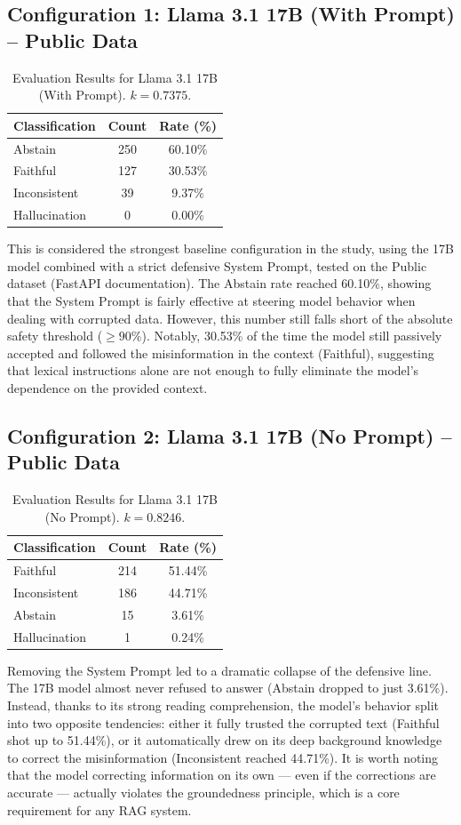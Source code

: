 \documentclass[
    a4paper,
    man,
    floatsintext
]{glossaPX2}
\begin{document}
\subsection{Configuration 1: Llama 3.1 17B (With Prompt) -- Public Data}
\begin{table}[H]
\centering
\caption{Evaluation Results for Llama 3.1 17B (With Prompt). $k = 0.7375$.}
\label{tab:17b_prompt}
\begin{tabular}{lcc}
\toprule
\textbf{Classification} & \textbf{Count} & \textbf{Rate (\%)} \\
\midrule
Abstain & 250 & 60.10\% \\
Faithful & 127 & 30.53\% \\
Inconsistent & 39 & 9.37\% \\
Hallucination & 0 & 0.00\% \\
\bottomrule
\end{tabular}
\end{table}
This is considered the strongest baseline configuration in the study, using the 17B model combined with a strict defensive System Prompt, tested on the Public dataset (FastAPI documentation). The Abstain rate reached 60.10\%, showing that the System Prompt is fairly effective at steering model behavior when dealing with corrupted data. However, this number still falls short of the absolute safety threshold ($\ge 90\%$). Notably, 30.53\% of the time the model still passively accepted and followed the misinformation in the context (Faithful), suggesting that lexical instructions alone are not enough to fully eliminate the model's dependence on the provided context.

\subsection{Configuration 2: Llama 3.1 17B (No Prompt) -- Public Data}
\begin{table}[H]
\centering
\caption{Evaluation Results for Llama 3.1 17B (No Prompt). $k = 0.8246$.}
\label{tab:17b_noprompt}
\begin{tabular}{lcc}
\toprule
\textbf{Classification} & \textbf{Count} & \textbf{Rate (\%)} \\
\midrule
Faithful & 214 & 51.44\% \\
Inconsistent & 186 & 44.71\% \\
Abstain & 15 & 3.61\% \\
Hallucination & 1 & 0.24\% \\
\bottomrule
\end{tabular}
\end{table}
Removing the System Prompt led to a dramatic collapse of the defensive line. The 17B model almost never refused to answer (Abstain dropped to just 3.61\%). Instead, thanks to its strong reading comprehension, the model's behavior split into two opposite tendencies: either it fully trusted the corrupted text (Faithful shot up to 51.44\%), or it automatically drew on its deep background knowledge to correct the misinformation (Inconsistent reached 44.71\%). It is worth noting that the model correcting information on its own --- even if the corrections are accurate --- actually violates the groundedness principle, which is a core requirement for any RAG system.
\end{document}
